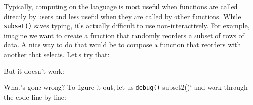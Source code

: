 Typically, computing on the language is most useful when functions are
called directly by users and less useful when they are called by other
functions. While \texttt{subset()} saves typing, it's actually difficult
to use non-interactively. For example, imagine we want to create a
function that randomly reorders a subset of rows of data. A nice way to
do that would be to compose a function that reorders with another that
selects. Let's try that: 

\begin{Shaded}
\begin{Highlighting}[]
\StringTok{ }
  \StringTok{ }
  \StringTok{ }\NormalTok{())}
\NormalTok{\}}

\StringTok{ }\NormalTok{function(x) x[}\NormalTok{(}\NormalTok{(x)), ]}

\StringTok{ }
  \NormalTok{(}
\NormalTok{\}}
\end{Highlighting}
\end{Shaded}

But it doesn't work:

\begin{Shaded}
\begin{Highlighting}[]
\StringTok{ }\NormalTok{)}
\NormalTok{()}
\end{Highlighting}
\end{Shaded}

What's gone wrong? To figure it out, let us \texttt{debug()} subset2()`
and work through the code line-by-line:

